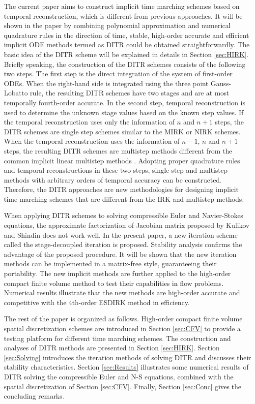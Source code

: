 The current paper aims to construct implicit
time marching schemes based on temporal
reconstruction, which is different from previous approaches.
It will be shown in the paper by combining polynomial approximation and
numerical quadrature rules in the direction of time,
stable,
high-order accurate and efficient implicit ODE methods
termed as DITR could be
obtained straightforwardly.
The basic idea of the DITR scheme will be explained in details
in Section \ref{sec:HIRK}.
Briefly speaking, the construction of the DITR
schemes consists of the following two steps.
The first step is the direct integration of the
system of first-order ODEs.
When the right-hand side is integrated using the
three point Gauss-Lobatto rule, the resulting DITR
schemes have two stages and are at most temporally fourth-order accurate.
In the second step, temporal reconstruction is used to determine the
unknown stage values based on the known step values.
If the temporal reconstruction uses only the information of $n$
and $n+1$ steps, the DITR schemes are single step schemes
similar to the MIRK or NIRK schemes.
When the temporal reconstruction uses the information of $n-1$, $n$ and $n+1$ steps,
the resulting DITR schemes are multistep methods
different from the common implicit linear multistep
methods \cite{wanner1996solving}.
Adopting proper quadrature rules
and temporal reconstructions in these two steps, single-step
and multistep methods with arbitrary orders of temporal
accuracy can be constructed. Therefore, the DITR approaches
are new methodologies for designing implicit time marching
schemes that are different from the IRK and multistep
methods.

When applying DITR schemes to solving compressible Euler and
Navier-Stokes equations, the approximate factorization of Jacobian matrix
proposed by Kulikov and Shindin \cite{kulikov2007asymptotic}
does not work well.
In the present paper,
a new iteration scheme called the stage-decoupled iteration
is proposed.
Stability analysis
confirms the advantage of the proposed procedure.
It will be shown that the new iteration methods can be implemented
in a matrix-free style, guaranteeing their portability.
The new implicit methods are further applied to the
high-order compact finite volume method \cite{wang2017compact_VR} to
test their capabilities in flow problems. Numerical results
illustrate that the new methods are high-order accurate
and competitive with the 4th-order ESDIRK method in efficiency.

The rest of the paper is organized as follows.
High-order compact finite volume spatial discretization schemes
are introduced in Section \ref{sec:CFV} to provide a testing platform for
different time marching schemes.
The construction and analyses of DITR methods are presented
in Section \ref{sec:HIRK}.
Section \ref{sec:Solving} introduces the iteration methods
of solving DITR and discusses their stability characteristics.
Section \ref{sec:Results} illustrates some numerical results of
DITR solving the compressible Euler and N-S equations, combined with
the spatial discretization of Section \ref{sec:CFV}.
Finally, Section \ref{sec:Conc} gives the concluding remarks.


